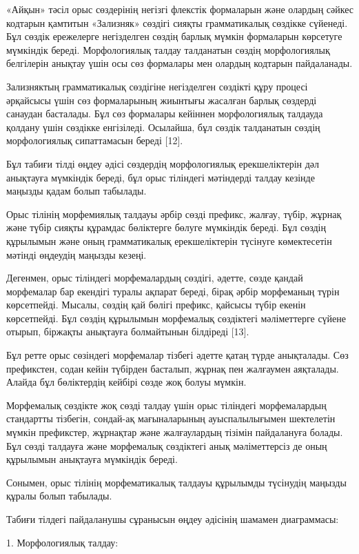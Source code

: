 «Айқын» тәсіл орыс сөздерінің негізгі флекстік формаларын және олардың
сәйкес кодтарын қамтитын «Зализняк» сөздігі сияқты грамматикалық
сөздікке сүйенеді. Бұл сөздік ережелерге негізделген сөздің барлық
мүмкін формаларын көрсетуге мүмкіндік береді. Морфологиялық талдау
талданатын сөздің морфологиялық белгілерін анықтау үшін осы сөз
формалары мен олардың кодтарын пайдаланады.

Зализняктың грамматикалық сөздігіне негізделген сөздікті құру процесі
әрқайсысы үшін сөз формаларының жиынтығы жасалған барлық сөздерді
санаудан басталады. Бұл сөз формалары кейіннен морфологиялық талдауда
қолдану үшін сөздікке енгізіледі. Осылайша, бұл сөздік талданатын сөздің
морфологиялық сипаттамасын береді {[}12{]}.

Бұл табиғи тілді өңдеу әдісі сөздердің морфологиялық ерекшеліктерін дәл
анықтауға мүмкіндік береді, бұл орыс тіліндегі мәтіндерді талдау кезінде
маңызды қадам болып табылады.

Орыс тілінің морфемиялық талдауы әрбір сөзді префикс, жалғау, түбір,
жұрнақ және түбір сияқты құрамдас бөліктерге бөлуге мүмкіндік береді.
Бұл сөздің құрылымын және оның грамматикалық ерекшеліктерін түсінуге
көмектесетін мәтінді өңдеудің маңызды кезеңі.

Дегенмен, орыс тіліндегі морфемалардың сөздігі, әдетте, сөзде қандай
морфемалар бар екендігі туралы ақпарат береді, бірақ әрбір морфеманың
түрін көрсетпейді. Мысалы, сөздің қай бөлігі префикс, қайсысы түбір
екенін көрсетпейді. Бұл сөздің құрылымын морфемалық сөздіктегі
мәліметтерге сүйене отырып, біржақты анықтауға болмайтынын білдіреді
{[}13{]}.

Бұл ретте орыс сөзіндегі морфемалар тізбегі әдетте қатаң түрде
анықталады. Сөз префикстен, содан кейін түбірден басталып, жұрнақ пен
жалғаумен аяқталады. Алайда бұл бөліктердің кейбірі сөзде жоқ болуы
мүмкін.

Морфемалық сөздікте жоқ сөзді талдау үшін орыс тіліндегі морфемалардың
стандартты тізбегін, сондай-ақ мағыналарының ауыспалылығымен шектелетін
мүмкін префикстер, жұрнақтар және жалғаулардың тізімін пайдалануға
болады. Бұл сөзді талдауға және морфемалық сөздіктегі анық мәліметтерсіз
де оның құрылымын анықтауға мүмкіндік береді.

Сонымен, орыс тілінің морфематикалық талдауы құрылымды түсінудің маңызды
құралы болып табылады.

Табиғи тілдегі пайдаланушы сұранысын өңдеу әдісінің шамамен диаграммасы:

1. Морфологиялық талдау:

